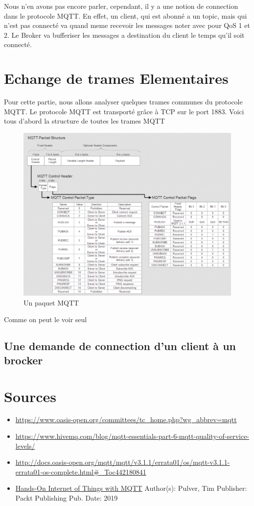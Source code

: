 \documentclass[a4paper,10pt]{article}
\begin{document}
Nous n'en avons pas encore parler, cependant, il y a une notion de connection dans le protocole MQTT. En effet, un client, qui est abonné a un topic, mais qui n'est pas connecté va quand meme recevoir les messages noter avec pour QoS 1 et 2. Le Broker va bufferiser les messages a destination du client le temps qu'il soit connecté.


\section{Echange de trames Elementaires}

Pour cette partie, nous allons analyser quelques trames  communes du protocole MQTT. Le protocole MQTT est transporté grâce à TCP sur le port 1883.
 Voici tous d'abord la structure de toutes les trames MQTT

\begin{figure}[h!]
\centering
\includegraphics[scale=0.350]{paquet.jpg}
\caption{Un paquet MQTT}
\label{fig:paquet}
\end{figure}
Comme on peut le voir seul 

\subsection{Une demande de connection d'un client à un brocker}




 \section{Sources}

\begin{itemize}
 \item \url{https://www.oasis-open.org/committees/tc_home.php?wg_abbrev=mqtt}
 \item \url{https://www.hivemq.com/blog/mqtt-essentials-part-6-mqtt-quality-of-service-levels/}
 \item \url{http://docs.oasis-open.org/mqtt/mqtt/v3.1.1/errata01/os/mqtt-v3.1.1-errata01-os-complete.html#_Toc442180841}
 \item \underline{Hands-On Internet of Things with MQTT} Author(s): Pulver, Tim Publisher: Packt Publishing Pub. Date: 2019
\end{itemize}
\end{document}
